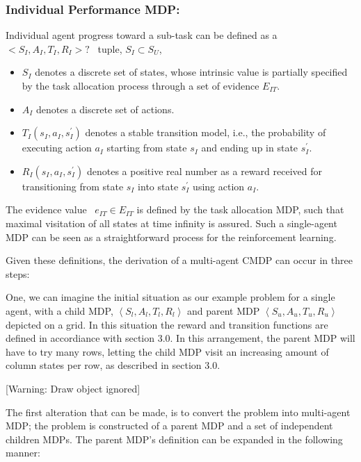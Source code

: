 \documentclass{article}
\begin{document}
\bigskip

\subsubsection{Individual Performance MDP:}
Individual agent progress toward a sub-task can be defined as a  $<S_I,A_I,T_I,R_I>?$ \ tuple,  $S_I{\subset}S_U$,

\begin{itemize}
\item  $S_I$ denotes a discrete set of states, whose intrinsic value is partially specified by the task allocation process through a set of evidence  $E_{\mathit{IT}}$. 
\item  $A_I$ denotes a discrete set of actions.
\item  $T_I\left(s_I,a_I,s_I^'\right)$ denotes a stable transition model, i.e., the probability of executing action  $a_I$ starting from state  $s_I$ and ending up in state  $s_I^'$.
\item  $R_I(s_I,a_I,s_I^')$ denotes a positive real number as a reward received for transitioning from state  $s_I$ into state  $s_I^'$ using action  $a_I$.
\end{itemize}
The evidence value \  $e_{\mathit{IT}}{\in}E_{\mathit{IT}}$ is defined by the task allocation MDP, such that maximal visitation of all states at time infinity is assured. Such a single-agent MDP can be seen as a straightforward process for the reinforcement learning.

Given these definitions, the derivation of a multi-agent CMDP can occur in three steps:

One, we can imagine the initial situation as our example problem for a single agent, with a child MDP,  $\left\langle S_l,A_l,T_l,R_l\right\rangle $ and parent MDP  $\left\langle S_u,A_u,T_u,R_u\right\rangle $ depicted on a grid. In this situation the reward and transition functions are defined in accordiance with section 3.0. In this arrangement, the parent MDP will have to try many rows, letting the child MDP visit an increasing amount of column states per row, as described in section 3.0.

[Warning: Draw object ignored]

The first alteration that can be made, is to convert the problem into multi-agent MDP; the problem is constructed of a parent MDP and a set of independent children MDPs. The parent MDP's definition can be expanded in the following manner:
\end{document}
